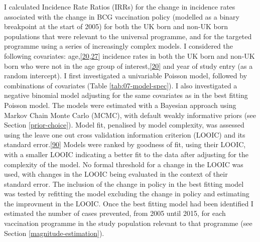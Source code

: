 \documentclass[11pt,twoside]{bristolthesis}
\begin{document}
  I calculated Incidence Rate Ratios (IRRs) for the change in incidence rates associated with the change in BCG vaccination policy (modelled as a binary breakpoint at the start of 2005) for both the UK born and non-UK born populations that were relevant to the universal programme, and for the targeted programme using a series of increasingly complex models. I considered the following covariates: age,{[}\protect\hyperlink{ref-PHE2016a}{20},\protect\hyperlink{ref-Zwerling2011}{27}{]} incidence rates in both the UK born and non-UK born who were not in the age group of interest,{[}\protect\hyperlink{ref-PHE2016a}{20}{]} and year of study entry (as a random intercept). I first investigated a univariable Poisson model, followed by combinations of covariates (Table \ref{tab:07-model-spec}). I also investigated a negative binomial model adjusting for the same covariates as in the best fitting Poisson model. The models were estimated with a Bayesian approach using Markov Chain Monte Carlo (MCMC), with default weakly informative priors (see Section \ref{prior-choice}). Model fit, penalised by model complexity, was assessed using the leave one out cross validation information criterion (LOOIC) and its standard error.{[}\protect\hyperlink{ref-Vehtari2016}{90}{]} Models were ranked by goodness of fit, using their LOOIC, with a smaller LOOIC indicating a better fit to the data after adjusting for the complexity of the model. No formal threshold for a change in the LOOIC was used, with changes in the LOOIC being evaluated in the context of their standard error. The inclusion of the change in policy in the best fitting model was tested by refitting the model excluding the change in policy and estimating the improvment in the LOOIC. Once the best fitting model had been identified I estimated the number of cases prevented, from 2005 until 2015, for each vaccination programme in the study population relevant to that programme (see Section \ref{magnitude-estimation}).
\end{document}
